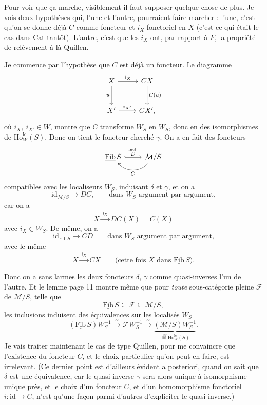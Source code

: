 \documentclass[11pt]{article}
\newcommand{\printedpage}[1]{\marginpar{\footnotesize p.~#1}}
\newcommand{\msp}[1]{\marginpar{\footnotesize [#1]}}
\newcommand{\cM}{\mathcal{M}}
\newcommand{\cF}{\mathcal{F}}
\newcommand{\Fib}{\underline{\mathrm{Fib}}\,}
\newcommand{\Ho}{\mathrm{Ho}}
\begin{document}
Pour voir que ça marche, visiblement il faut supposer quelque chose de plus. Je vois deux
hypothèses qui, l'une et l'autre, pourraient faire marcher : l'une, c'est qu'on se donne
déjà $C$ comme foncteur et $i_X$ fonctoriel en $X$ (c'est ce qui était le cas dans Cat tantôt).
L'autre, c'est que
\msp{page 88}les $i_X$ ont, par rapport à $F$, la propriété de relèvement à là Quillen. %

Je commence par l'hypothèse que $C$ est déjà un foncteur. Le diagramme
\[
\begin{tikzcd}[row sep=large]
X \arrow[r, "i_X"] \arrow[d, "u"'] & CX \arrow[d, "C(u)"] \\
X' \arrow[r, "i_{X'}"] & CX',
\end{tikzcd}
\]
où $i_X,\ i_{X'}\in W$, montre que $C$ transforme $W_S$ en $W_S$, donc en des isomorphismes de
$\Ho^{\mathrm{lc}}_W(S)$. Donc on tient le foncteur cherché $\gamma$. On a en fait des foncteurs
\[
\begin{tikzcd}
\Fib S \arrow[r, hook, "\overset{\text{incl.}}{D}"] & \cM/S \arrow[l, bend left=50, "C"]
\end{tikzcd}
\]
compatibles avec les localiseurs $W_S$, induisant $\delta$ et $\gamma$, et on a
\[
\mathrm{id}_{\cM/S}\longrightarrow DC, \qquad \text{dans $W_S$ argument par argument,}
\]
car on a
\[
X\xrightarrow{\ i_X\ }DC(X)=C(X)
\]
avec $i_X\in W_S$. De même, on a
\[
\mathrm{id}_{\Fib S}\longrightarrow CD \qquad \text{dans $W_S$ argument par argument,}
\]
\printedpage{56}
avec le même
\[
X\xrightarrow{\ i_X\ }CX \qquad \text{(cette fois $X$ dans $\Fib S$).}
\]

\msp{page 89}Donc on a sans larmes les deux foncteurs $\delta$, $\gamma$ comme quasi-inverses l'un de l'autre. Et le
lemme page 11 montre même que pour \textit{toute} sous-catégorie pleine $\cF$ de $\cM/S$, telle que
\[
\Fib S\subseteq\cF\subseteq\cM/S,
\]
les inclusions induisent des équivalences sur les localisés $W_S$
\[
(\Fib S)W_S^{-1}\xrightarrow{\ \sim\ }\cF W_S^{-1}\xrightarrow{\ \sim\ }\underbrace{(\cM/S)W_S^{-1}}_{\overset{\text{déf}}{=}\Ho^{\mathrm{lc}}_W(S)}.
\]
Je vais traiter maintenant le cas de type Quillen, pour me convaincre que l'existence du
foncteur $C$, et le choix particulier qu'on peut en faire, est irrelevant. (Ce dernier point
est d'ailleurs évident a posteriori, quand on sait que $\delta$ est une équivalence, car le quasi-inverse
$\gamma$ sera alors unique à isomorphisme unique près, et le choix d'un foncteur $C$, et
d'un homomorphisme fonctoriel $i:\mathrm{id}\longrightarrow C$, n'est qu'une façon parmi d'autres d'expliciter
le quasi-inverse.)
\end{document}
